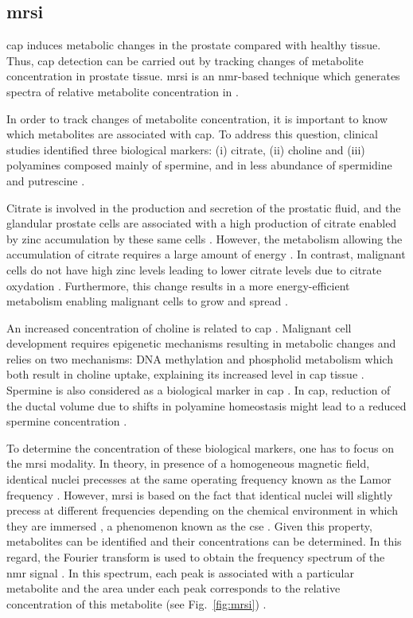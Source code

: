 \subsection{\acs*{mrsi}}\label{subsec:chp2:imaging:mrsi}
\ac{cap} induces metabolic changes in the prostate compared with healthy tissue.
Thus, \ac{cap} detection can be carried out by tracking changes of metabolite concentration in prostate tissue.
\ac{mrsi} is an \ac{nmr}-based technique which generates spectra of relative metabolite concentration in .

In order to track changes of metabolite concentration, it is important to know which metabolites are associated with \ac{cap}.
To address this question, clinical studies identified three biological markers: (i) citrate, (ii) choline and (iii) polyamines composed mainly of spermine, and in less abundance of spermidine and putrescine \cite{Awwad2012,Costello2006,Giskeodegard2013}. 

Citrate is involved in the production and secretion of the prostatic fluid, and the glandular prostate cells are associated with a high production of citrate enabled by zinc accumulation by these same cells \cite{Costello2006}.
However, the metabolism allowing the accumulation of citrate requires a large amount of energy \cite{Costello2006}.
In contrast, malignant cells do not have high zinc levels leading to lower citrate levels due to citrate oxydation \cite{Costello2006}.
Furthermore, this change results in a more energy-efficient metabolism enabling malignant cells to grow and spread \cite{Costello2006}.

An increased concentration of choline is related to \ac{cap} \cite{Awwad2012}.
Malignant cell development requires epigenetic mechanisms resulting in metabolic changes and relies on two mechanisms: DNA methylation and phospholid metabolism which both result in choline uptake, explaining its increased level in \ac{cap} tissue \cite{Awwad2012}.
Spermine is also considered as a biological marker in \ac{cap} \cite{Graaf2000,Giskeodegard2013}.
In \ac{cap}, reduction of the ductal volume due to shifts in polyamine homeostasis might lead to a reduced spermine concentration \cite{Graaf2000}.

To determine the concentration of these biological markers, one has to focus on the \ac{mrsi} modality.
In theory, in presence of a homogeneous magnetic field, identical nuclei precesses at the same operating frequency known as the Lamor frequency \cite{Haacke1999}.
However, \ac{mrsi} is based on the fact that identical nuclei will slightly precess at different frequencies depending on the chemical environment in which they are immersed \cite{Haacke1999}, a phenomenon known as the \ac{cse} \cite{Parfait2010}.
Given this property, metabolites can be identified and their concentrations can be determined.
In this regard, the Fourier transform is used to obtain the frequency spectrum of the \ac{nmr} signal \cite{Haacke1999,Parfait2010}.
In this spectrum, each peak is associated with a particular metabolite and the area under each peak corresponds to the relative concentration of this metabolite (see Fig.~\ref{fig:mrsi}) \cite{Parfait2010}.

